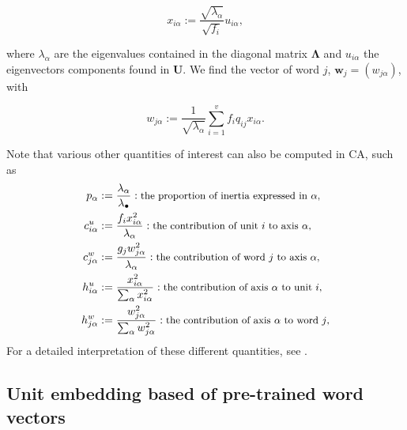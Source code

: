 \documentclass[
twocolumn,
]{ceurart}
\begin{document}
\begin{equation}
x_{i\alpha} := \frac{\sqrt{\lambda_\alpha}}{\sqrt{f_i}} u_{i \alpha},
\end{equation}

where $\lambda_\alpha$ are the eigenvalues contained in the diagonal matrix $\bm{\Lambda}$ and $u_{i \alpha}$ the eigenvectors components found in $\mathbf{U}$. We find the vector of word $j$, $\mathbf{w}_j = (w_{j\alpha})$, with 

\begin{equation}
w_{j\alpha} := \frac{1}{\sqrt{\lambda_\alpha}} \sum_{i=1}^v f_i q_{ij} x_{i \alpha}.
\end{equation}

Note that various other quantities of interest can also be computed in CA, such as 
\begin{align*}
p_\alpha &:= \frac{\lambda_\alpha}{\lambda_\bullet} :\text{\small the proportion of inertia expressed in $\alpha$,} \\
c^u_{i \alpha} &:= \frac{f_i x_{i\alpha}^2}{\lambda_\alpha} : \text{\small the contribution of unit $i$ to axis $\alpha$,} \\
c^w_{j \alpha} &:= \frac{g_j w_{j\alpha}^2}{\lambda_\alpha} : \text{\small the contribution of word $j$ to axis $\alpha$,} \\
h^u_{i \alpha} &:= \frac{x_{i\alpha}^2}{\sum_{\alpha} x_{i\alpha}^2} : \text{\small the contribution of  axis $\alpha$ to unit $i$,} \\
h^w_{j \alpha} &:= \frac{w_{j\alpha}^2}{\sum_{\alpha} w_{j\alpha}^2} : \text{\small the contribution of  axis $\alpha$ to word $j$,}
\end{align*}
For a detailed interpretation of these different quantities, see \cite{Lebart2019}. 

\subsection{Unit embedding based of pre-trained word vectors}
\label{wv_details}
\end{document}
